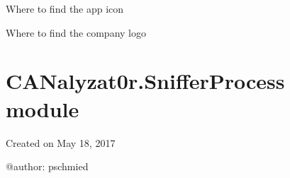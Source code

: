 \documentclass[letterpaper,10pt,english]{sphinxmanual}
\begin{document}

\begin{fulllineitems}
\label{\detokenize{src:src.Settings.ICON_PATH}}
Where to find the app icon

\end{fulllineitems}


\begin{fulllineitems}
\label{\detokenize{src:src.Settings.LOGO_PATH}}
Where to find the company logo

\end{fulllineitems}



\section{CANalyzat0r.SnifferProcess module}
\label{\detokenize{src:module-src.SnifferProcess}}\label{\detokenize{src:canalyzat0r-snifferprocess-module}}
Created on May 18, 2017

@author: pschmied
\end{document}
